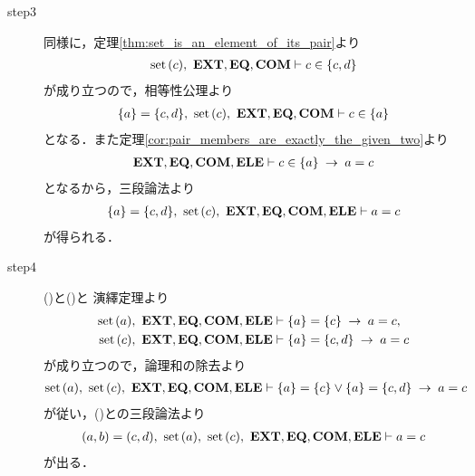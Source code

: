 \begin{sketch}
\begin{description}
			\item[step3] 同様に，定理\ref{thm:set_is_an_element_of_its_pair}より
				\begin{align}
					\operatorname*{set}\hspace{0.15em}(c),\ \mbox{{\bf EXT}},\mbox{{\bf EQ}},\mbox{\bf COM} \vdash c \in \{c,d\}
				\end{align}
				が成り立つので，相等性公理より
				\begin{align}
					\{a\} = \{c,d\},\ \operatorname*{set}\hspace{0.15em}(c),\ \mbox{{\bf EXT}},\mbox{{\bf EQ}},\mbox{\bf COM} \vdash c \in \{a\}
				\end{align}
				となる．また定理\ref{cor:pair_members_are_exactly_the_given_two}より
				\begin{align}
					\mbox{{\bf EXT}},\mbox{{\bf EQ}},\mbox{\bf COM},\mbox{{\bf ELE}} \vdash c \in \{a\} \hspace{0.25em}\rightarrow\hspace{0.25em} a = c
				\end{align}
				となるから，三段論法より
				\begin{align}
					\{a\} = \{c,d\},\ \set{c},\ \EXTAX,\EQAX,\COMAX,\ELEAX \vdash a = c
					\label{fom:equality_of_ordered_pairs_4}
				\end{align}
				が得られる．
				
			\item[step4] ()と()と
				演繹定理より
				\begin{align}
					\operatorname*{set}\hspace{0.15em}(a),\ \mbox{{\bf EXT}},\mbox{{\bf EQ}},\mbox{\bf COM},\mbox{{\bf ELE}} &\vdash \{a\} = \{c\} \hspace{0.25em}\rightarrow\hspace{0.25em} a = c, \\
					\operatorname*{set}\hspace{0.15em}(c),\ \mbox{{\bf EXT}},\mbox{{\bf EQ}},\mbox{\bf COM},\mbox{{\bf ELE}} &\vdash \{a\} = \{c,d\} \hspace{0.25em}\rightarrow\hspace{0.25em} a = c
				\end{align}
				が成り立つので，論理和の除去より
				\begin{align}
					\operatorname*{set}\hspace{0.15em}(a),\ \operatorname*{set}\hspace{0.15em}(c),\ \mbox{{\bf EXT}},\mbox{{\bf EQ}},\mbox{\bf COM},\mbox{{\bf ELE}} \vdash 
					\{a\} = \{c\} \vee \{a\} = \{c,d\} \hspace{0.25em}\rightarrow\hspace{0.25em} a = c
				\end{align}
				が従い，()との三段論法より
				\begin{align}
					(a,b) = (c,d),\ \set{a},\ \set{c},\ \EXTAX,\EQAX,\COMAX,\ELEAX \vdash a = c
					\label{fom:equality_of_ordered_pairs_5}
				\end{align}
				が出る．
				

\end{description}
\end{sketch}
